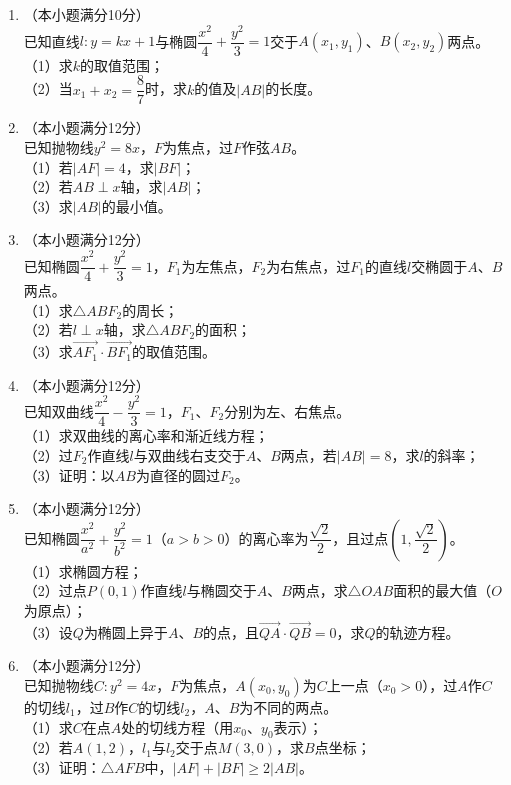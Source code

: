 \documentclass[12pt, a4paper]{ctexart}
\begin{document}
\begin{enumerate}[label=\arabic*.]

\item （本小题满分10分）\\
已知直线$l:y=kx+1$与椭圆$\dfrac{x^2}{4}+\dfrac{y^2}{3}=1$交于$A(x_1,y_1)$、$B(x_2,y_2)$两点。\\
（1）求$k$的取值范围；\\
（2）当$x_1+x_2=\dfrac{8}{7}$时，求$k$的值及$|AB|$的长度。
\vspace{6cm}

\item （本小题满分12分）\\
已知抛物线$y^2=8x$，$F$为焦点，过$F$作弦$AB$。\\
（1）若$|AF|=4$，求$|BF|$；\\
（2）若$AB\perp x$轴，求$|AB|$；\\
（3）求$|AB|$的最小值。
\vspace{6cm}

\item （本小题满分12分）\\
已知椭圆$\dfrac{x^2}{4}+\dfrac{y^2}{3}=1$，$F_1$为左焦点，$F_2$为右焦点，过$F_1$的直线$l$交椭圆于$A$、$B$两点。\\
（1）求$\triangle ABF_2$的周长；\\
（2）若$l\perp x$轴，求$\triangle ABF_2$的面积；\\
（3）求$\overrightarrow{AF_1}\cdot\overrightarrow{BF_1}$的取值范围。
\vspace{6cm}

\item （本小题满分12分）\\
已知双曲线$\dfrac{x^2}{4}-\dfrac{y^2}{3}=1$，$F_1$、$F_2$分别为左、右焦点。\\
（1）求双曲线的离心率和渐近线方程；\\
（2）过$F_2$作直线$l$与双曲线右支交于$A$、$B$两点，若$|AB|=8$，求$l$的斜率；\\
（3）证明：以$AB$为直径的圆过$F_2$。
\vspace{6cm}

\item （本小题满分12分）\\
已知椭圆$\dfrac{x^2}{a^2}+\dfrac{y^2}{b^2}=1$（$a>b>0$）的离心率为$\dfrac{\sqrt{2}}{2}$，且过点$(1,\dfrac{\sqrt{2}}{2})$。\\
（1）求椭圆方程；\\
（2）过点$P(0,1)$作直线$l$与椭圆交于$A$、$B$两点，求$\triangle OAB$面积的最大值（$O$为原点）；\\
（3）设$Q$为椭圆上异于$A$、$B$的点，且$\overrightarrow{QA}\cdot\overrightarrow{QB}=0$，求$Q$的轨迹方程。
\vspace{6cm}

\item （本小题满分12分）\\
已知抛物线$C:y^2=4x$，$F$为焦点，$A(x_0,y_0)$为$C$上一点（$x_0>0$），过$A$作$C$的切线$l_1$，过$B$作$C$的切线$l_2$，$A$、$B$为不同的两点。\\
（1）求$C$在点$A$处的切线方程（用$x_0$、$y_0$表示）；\\
（2）若$A(1,2)$，$l_1$与$l_2$交于点$M(3,0)$，求$B$点坐标；\\
（3）证明：$\triangle AFB$中，$|AF|+|BF|\geq 2|AB|$。
\vspace{6cm}

\end{enumerate}
\end{document}
